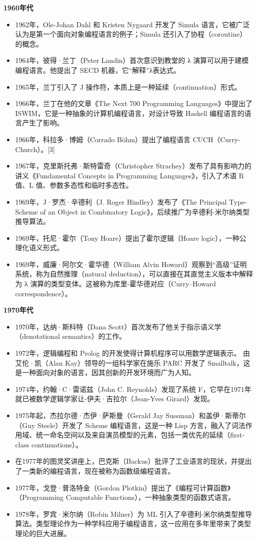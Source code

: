 \textbf{1960年代}  
\begin{itemize}
\item 1962年，Ole-Johan Dahl 和 Kristen Nygaard 开发了 Simula 语言，它被广泛认为是第一个面向对象编程语言的例子；Simula 还引入了协程（coroutine）的概念。  
\item 1964年，彼得·兰丁（Peter Landin）首次意识到教堂的 λ 演算可以用于建模编程语言。他提出了 SECD 机器，它“解释”λ表达式。  
\item 1965年，兰丁引入了 J 操作符，本质上是一种延续（continuation）形式。  
\item 1966年，兰丁在他的文章《The Next 700 Programming Languages》中提出了 ISWIM，它是一种抽象的计算机编程语言，对设计导致 Haskell 编程语言的语言产生了影响。  
\item 1966年，科拉多·博姆（Corrado Böhm）提出了编程语言 CUCH（Curry-Church）。[3]  
\item 1967年，克里斯托弗·斯特雷奇（Christopher Strachey）发布了具有影响力的讲义《Fundamental Concepts in Programming Languages》，引入了术语 R 值、L 值、参数多态性和临时多态性。  
\item 1969年，J·罗杰·辛德利（J. Roger Hindley）发布了《The Principal Type-Scheme of an Object in Combinatory Logic》，后续推广为辛德利-米尔纳类型推导算法。  
\item 1969年，托尼·霍尔（Tony Hoare）提出了霍尔逻辑（Hoare logic），一种公理化语义形式。  
\item 1969年，威廉·阿尔文·霍华德（William Alvin Howard）观察到“高级”证明系统，称为自然推理（natural deduction），可以直接在其直觉主义版本中解释为 λ 演算的类型变体。这被称为库里-霍华德对应（Curry–Howard correspondence）。
\end{itemize}
\textbf{1970年代}  
\begin{itemize}
\item 1970年，达纳·斯科特（Dana Scott）首次发布了他关于指示语义学（denotational semantics）的工作。  
\item 1972年，逻辑编程和 Prolog 的开发使得计算机程序可以用数学逻辑表示。  
由艾伦·凯（Alan Kay）领导的一组科学家在施乐 PARC 开发了 Smalltalk，这是一种面向对象的语言，因其创新的开发环境而广为人知。  
\item 1974年，约翰·C·雷诺兹（John C. Reynolds）发现了系统 F，它早在1971年就已被数学逻辑学家让-伊夫·吉拉尔（Jean-Yves Girard）发现。  
\item 1975年起，杰拉尔德·杰伊·萨斯曼（Gerald Jay Sussman）和盖伊·斯蒂尔（Guy Steele）开发了 Scheme 编程语言，这是一种 Lisp 方言，融入了词法作用域、统一命名空间以及来自演员模型的元素，包括一类优先的延续（first-class continuations）。  
\item 在1977年的图灵奖讲座上，巴克斯（Backus）批评了工业语言的现状，并提出了一类新的编程语言，现在被称为函数级编程语言。  
\item 1977年，戈登·普洛特金（Gordon Plotkin）提出了《编程可计算函数》（Programming Computable Functions），一种抽象类型的函数式语言。  
\item 1978年，罗宾·米尔纳（Robin Milner）为 ML 引入了辛德利-米尔纳类型推导算法。类型理论作为一种学科应用于编程语言，这一应用在多年里带来了类型理论的巨大进展。
\end{itemize}

